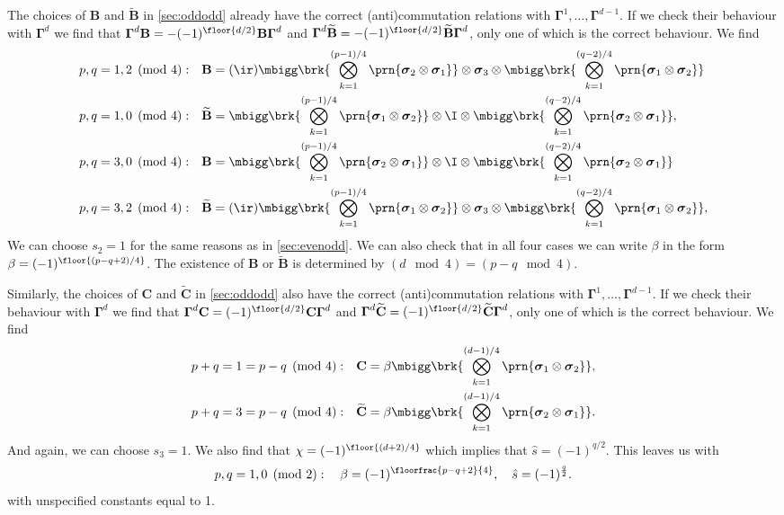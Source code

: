 \documentclass[11pt]{article}
\newcommand{\Gammab}{\boldsymbol{\Gamma}}
\newcommand{\B}{\mathbf{B}}
\renewcommand{\C}{\mathbf{C}}
\newcommand{\Bt}{\widetilde{\B}}
\newcommand{\Ct}{\widetilde{\C}}
\newcommand{\sigmab}{\boldsymbol{\sigma}}
\begin{document}
The choices of $\B$ and $\Bt$ in \cref{sec:oddodd} already have the correct (anti)commutation relations with $\Gammab^1, \ldots, \Gammab^{d-1}$.
If we check their behaviour with $\Gammab^d$ we find that $\Gammab^d \B = -(-1)^{\floor{d/2}}\B \Gammab^d$ and $\Gammab^d \Bt = -(-1)^{\floor{d/2}}\Bt \Gammab^d$, only one of which is the correct behaviour.
We find
%
\begin{equation*}
\begin{aligned}
  p, q &= 1, 2 \pmod 4: &
  \B &= (\ir)
        \mbigg\brk{\bigotimes_{k=1}^{(p-1)/4} \prn{\sigmab_2 \otimes \sigmab_1}} \otimes
        \sigmab_3 \otimes
        \mbigg\brk{\bigotimes_{k=1}^{(q-2)/4} \prn{\sigmab_1 \otimes \sigmab_2}} \\
  p, q &= 1, 0 \pmod 4: &
  \Bt &=
        \mbigg\brk{\bigotimes_{k=1}^{(p-1)/4} \prn{\sigmab_1 \otimes \sigmab_2}} \otimes
        \I \otimes
        \mbigg\brk{\bigotimes_{k=1}^{(q-2)/4} \prn{\sigmab_2 \otimes \sigmab_1}},
  \\
  p, q &= 3, 0 \pmod 4: &
  \B &=
        \mbigg\brk{\bigotimes_{k=1}^{(p-1)/4} \prn{\sigmab_2 \otimes \sigmab_1}} \otimes
        \I \otimes
        \mbigg\brk{\bigotimes_{k=1}^{(q-2)/4} \prn{\sigmab_2 \otimes \sigmab_1}} \\
  p, q &= 3, 2 \pmod 4: &
  \Bt &= (\ir)
        \mbigg\brk{\bigotimes_{k=1}^{(p-1)/4} \prn{\sigmab_1 \otimes \sigmab_2}} \otimes
        \sigmab_3 \otimes
        \mbigg\brk{\bigotimes_{k=1}^{(q-2)/4} \prn{\sigmab_1 \otimes \sigmab_2}},
\end{aligned}
\end{equation*}
%
We can choose $s_2 = 1$ for the same reasons as in \cref{sec:evenodd}.
We can also check that in all four cases we can write $\beta$ in the form $\beta = (-1)^{\floor{(p-q+2)/4}}$.
The existence of $\B$ or $\Bt$ is determined by $(d \mod 4) = (p-q \mod 4)$.

Similarly, the choices of $\C$ and $\Ct$ in \cref{sec:oddodd} also have the correct (anti)commutation relations with $\Gammab^1, \ldots, \Gammab^{d-1}$.
If we check their behaviour with $\Gammab^d$ we find that $\Gammab^d \C = (-1)^{\floor{d/2}}\C \Gammab^d$ and $\Gammab^d \Ct = (-1)^{\floor{d/2}} \Ct \Gammab^d$, only one of which is the correct behaviour.
We find
%
\begin{equation*}
\begin{aligned}
  p+q &= 1 = p-q \pmod 4: &
  \C &=  \beta
        \mbigg\brk{\bigotimes_{k=1}^{(d-1)/4} \prn{\sigmab_1 \otimes \sigmab_2}},
  \\
  p+q &= 3 = p-q \pmod 4: &
  \Ct &= \beta
        \mbigg\brk{\bigotimes_{k=1}^{(d-1)/4} \prn{\sigmab_2 \otimes \sigmab_1}}.
\end{aligned}
\end{equation*}
%
And again, we can choose $s_3 = 1$.
We also find that $\chi = (-1)^{\floor{(d+2)/4}}$ which implies that $\hat{s} = (-1)^{q/2}$.
This leaves us with
%
\begin{equation}\label{eq:constoddeven}
  p, q = 1,0 \pmod 2 : \quad
  \beta = (-1)^{\floorfrac{p-q+2}{4}}, \quad
  \hat{s} = (-1)^{\frac{q}{2}}.
\end{equation}
%
with unspecified constants equal to 1.
\end{document}
